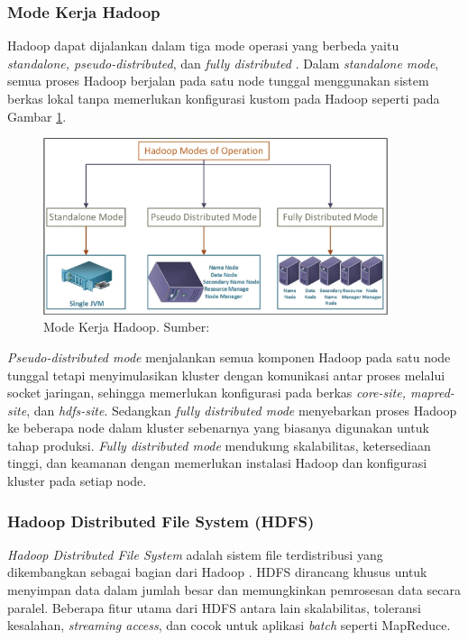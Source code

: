 \subsubsection{Mode Kerja Hadoop}
Hadoop dapat dijalankan dalam tiga mode operasi yang berbeda yaitu \textit{standalone, pseudo-distributed}, dan \textit{fully distributed} \cite{johnDataLakeEnterprises2017}. Dalam \textit{standalone mode}, semua proses Hadoop berjalan pada satu node tunggal menggunakan sistem berkas lokal tanpa memerlukan konfigurasi kustom pada Hadoop seperti pada Gambar \ref{fig:hadoop-modes}. 

\begin{figure}[h!]
    \centering
    \includegraphics[width=0.9\textwidth]{figures/ch02/hadoop-modes}
    \caption{Mode Kerja Hadoop. Sumber: \cite{khataiImplementationTextMining2021}}
    \label{fig:hadoop-modes}
\end{figure}

\textit{Pseudo-distributed mode} menjalankan semua komponen Hadoop pada satu node tunggal tetapi menyimulasikan kluster dengan komunikasi antar proses melalui socket jaringan, sehingga memerlukan konfigurasi pada berkas \textit{core-site, mapred-site}, dan \textit{hdfs-site}. Sedangkan \textit{fully distributed mode} menyebarkan proses Hadoop ke beberapa node dalam kluster sebenarnya yang biasanya digunakan untuk tahap produksi. \textit{Fully distributed mode} mendukung skalabilitas, ketersediaan tinggi, dan keamanan dengan memerlukan instalasi Hadoop dan konfigurasi kluster pada setiap node.

\subsubsection{Hadoop Distributed File System (HDFS)}
\textit{Hadoop Distributed File System} adalah sistem file terdistribusi yang dikembangkan sebagai bagian dari Hadoop \cite{abhishekIntegratedHadoopCloud2017}. HDFS dirancang khusus untuk menyimpan data dalam jumlah besar dan memungkinkan pemrosesan data secara paralel. Beberapa fitur utama dari HDFS antara lain skalabilitas, toleransi kesalahan, \textit{streaming access}, dan cocok untuk aplikasi \textit{batch} seperti MapReduce.

